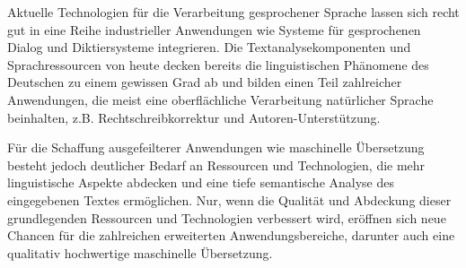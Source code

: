 \documentclass[]{../../metanetpaper}
\begin{document}
\begin{Parallel}[c]{80mm}{80mm}
{Aktuelle Technologien für die Verarbeitung gesprochener Sprache lassen sich recht gut in eine Reihe industrieller Anwendungen wie Systeme für gesprochenen Dialog und Diktiersysteme integrieren. Die Textanalysekomponenten und Sprachressourcen von heute decken bereits die linguistischen Phänomene des Deutschen zu einem gewissen Grad ab und bilden einen Teil zahlreicher Anwendungen, die meist eine oberflächliche Verarbeitung natürlicher Sprache beinhalten, z.B. Rechtschreibkorrektur und Autoren-Unterstützung.

Für die Schaffung ausgefeilterer Anwendungen wie maschinelle Übersetzung besteht jedoch deutlicher Bedarf an Ressourcen und Technologien, die mehr linguistische Aspekte abdecken und eine tiefe semantische Analyse des eingegebenen Textes ermöglichen. Nur, wenn die Qualität und Abdeckung dieser grundlegenden Ressourcen und Technologien verbessert wird, eröffnen sich neue Chancen für die zahlreichen erweiterten Anwendungsbereiche, darunter auch eine qualitativ hochwertige maschinelle Übersetzung. 
 }

\end{Parallel}
\end{document}
